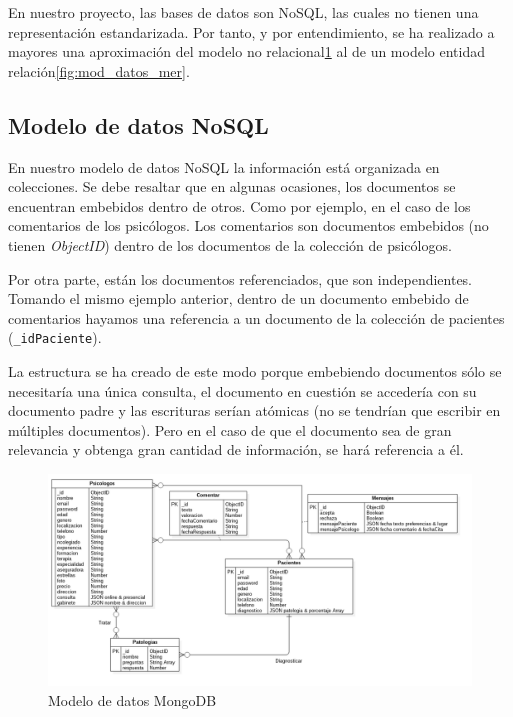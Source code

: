 En nuestro proyecto, las bases de datos son NoSQL, las cuales no tienen una representación estandarizada. Por tanto, y por entendimiento, se ha realizado a mayores una aproximación del modelo no relacional\ref{fig:mod_datos_mongoDB} al de un modelo entidad relación\ref{fig:mod_datos_mer}.

\subsection{Modelo de datos NoSQL}
En nuestro modelo de datos NoSQL la información está organizada en colecciones. Se debe resaltar que en algunas ocasiones, los documentos se encuentran embebidos dentro de otros. Como por ejemplo, en el caso de los comentarios de los psicólogos. Los comentarios son documentos embebidos (no tienen \textit{ObjectID}) dentro de los documentos de la colección de psicólogos.


Por otra parte, están los documentos referenciados, que son independientes. Tomando el mismo ejemplo anterior, dentro de un documento embebido de comentarios hayamos una referencia a un documento de la colección de pacientes (\texttt{\_idPaciente}).


La estructura se ha creado de este modo porque embebiendo documentos sólo se necesitaría una única consulta, el documento en cuestión se accedería con su documento padre y las escrituras serían atómicas (no se tendrían que escribir en múltiples documentos). Pero en el caso de que el documento sea de gran relevancia y obtenga gran cantidad de información, se hará referencia a él.


\begin{figure}[htbp] 
    \centering
    \includegraphics[width=1\textwidth]{figuras/bbdd_mod_mongoDB.png}
    \caption{Modelo de datos MongoDB}
    \label{fig:mod_datos_mongoDB}
\end{figure}	

